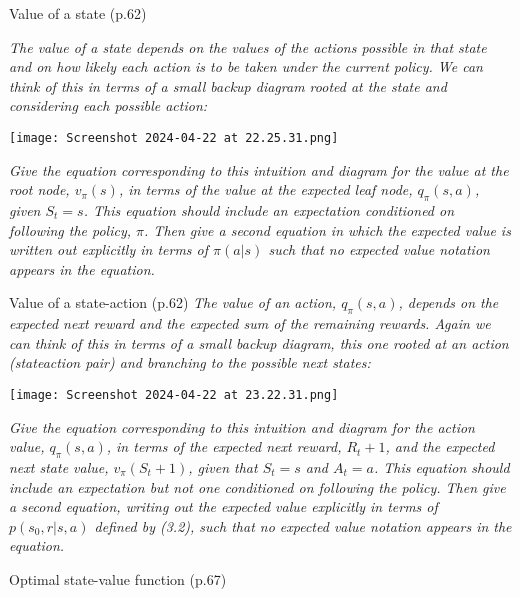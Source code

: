 \documentclass[12pt,letterpaper]{exam}
\begin{document}
\begin{questions}
	\setcounter{question}{18-1}%
	\question%
	Value of a state (p.62)

	\emph{The value of a state depends on the values of the actions possible in that 
	state and on how likely each action is to be taken under the current policy. 
	We can think of this in terms of a small backup diagram rooted at the state and considering each possible action:}

	\texttt{[image: Screenshot 2024-04-22 at 22.25.31.png]}%

	\emph{Give the equation corresponding to this intuition and diagram for the value at the root node, \(v_\pi(s)\), 
	in terms of the value at the expected leaf node, \(q_\pi(s, a)\), given \(S_t = s\).
	This equation should include an expectation conditioned on following the policy, \(\pi\). 
	Then give a second equation in which the expected value is written out explicitly in terms of \(\pi(a|s)\) 
	such that no expected value notation appears in the equation.}
	\begin{solution}

	\end{solution}

	\question%
	Value of a state-action (p.62)
	\emph{The value of an action, \(q_\pi(s, a)\), depends on the expected next reward and the expected sum of the remaining rewards. 
	Again we can think of this in terms of a small backup diagram, this one rooted at an action (state\-action pair) 
	and branching to the possible next states:}
	
	\texttt{[image: Screenshot 2024-04-22 at 23.22.31.png]}%

	\emph{Give the equation corresponding to this intuition and diagram for the action value, \(q_\pi(s, a)\), 
	in terms of the expected next reward, \(R_t+1\), and the expected next state value, \(v_\pi(S_t+1)\), 
	given that \(S_t = s\) and \(A_t = a\). This equation should include an expectation but not one conditioned on following the policy. 
	Then give a second equation, writing out the expected value explicitly in terms of \(p(s_0,r|s, a)\) defined by (3.2), 
	such that no expected value notation appears in the equation.}
	\begin{solution}

	\end{solution}

	\setcounter{question}{25-1}%
	\question%
	Optimal state-value function (p.67)


\end{questions}
\end{document}
